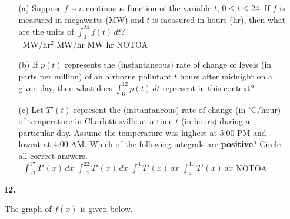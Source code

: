 \documentclass[11pt]{article}
\begin{document}
\begin{enumerate}
\begin{itemize}
    \item[(a)] Suppose $f$ is a continuous function of the variable $t$, $0\leq t\leq 24$. If $f$ is measured in megawatts (MW) and $t$ is measured in hours (hr), then what are the units of $\displaystyle\int_0^{24} f(t)\,dt$?\\

    \,\hfill
     MW/hr$^2$
    \hfill
     MW/hr
    \hfill
     MW
    \hfill
     hr
    \hfill
     NOTOA
    \hfill\,\\
\medskip{}

    \item[(b)] If $p(t)$ represents the (instantaneous) rate of change of levels (in parts per million) of an airborne pollutant $t$ hours after midnight on a given day, then what does $\displaystyle\int_6^{12} p(t)\,dt$ represent in this context?
        \vspace{6cm}

    \item[(c)] Let $T'(t)$ represent the (instantaneous) rate of change (in $^{\circ}$C/hour) of temperature in Charlottesville at a time $t$ (in hours) during a particular day. Assume the temperature was highest at 5:00 PM and lowest at 4:00 AM. Which of the following integrals are {\bf positive}? Circle all correct answers.\\[0.2in]
    \,\hfill
     $\displaystyle\int_{12}^{17} T'(x)\,dx$
    \hfill
     $\displaystyle\int_{17}^{22} T'(x)\,dx$
    \hfill
     $\displaystyle\int_1^4 T'(x)\,dx$
    \hfill
     $\displaystyle\int_4^{10} T'(x)\,dx$
    \hfill
     NOTOA        
\end{itemize}

\newpage

\item[\textbf{I2.}]

The graph of $f(x)$ is given below.


\end{enumerate}
\end{document}
